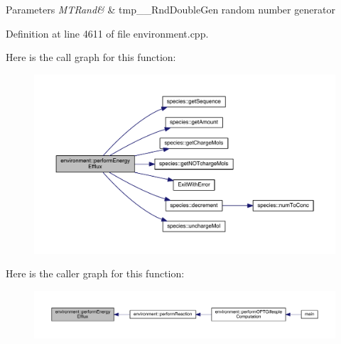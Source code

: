 \begin{DoxyParams}{Parameters}
{\em M\-T\-Rand\&} & tmp\-\_\-\-\_\-\-Rnd\-Double\-Gen random number generator \\
\hline
\end{DoxyParams}


Definition at line 4611 of file environment.\-cpp.



Here is the call graph for this function\-:\nopagebreak
\begin{figure}[H]
\begin{center}
\leavevmode
\includegraphics[width=350pt]{a00014_aff7607e0f3a74790109a7d87de3031bd_cgraph}
\end{center}
\end{figure}




Here is the caller graph for this function\-:\nopagebreak
\begin{figure}[H]
\begin{center}
\leavevmode
\includegraphics[width=350pt]{a00014_aff7607e0f3a74790109a7d87de3031bd_icgraph}
\end{center}
\end{figure}


